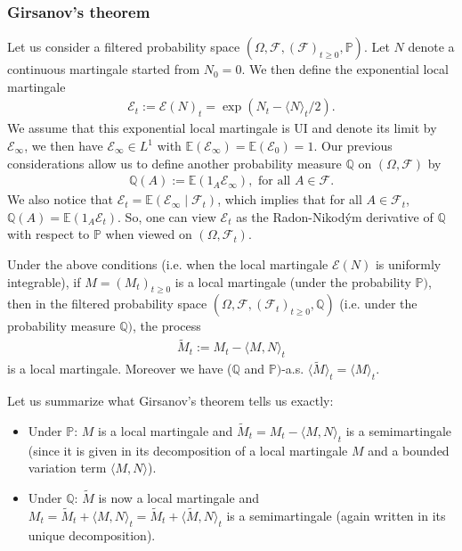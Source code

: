 \documentclass[../mainfile.tex]{subfiles}
\begin{document}
\subsubsection{Girsanov's theorem}
Let us consider a filtered probability space $( \Omega, \mathcal{F}, ( \mathcal{F})_{t \geq 0}, \mathbb{P})$. Let $N$ denote a continuous martingale started from $N_0=0$. We then define the exponential local martingale 
\begin{align*}
\mathcal{E}_t := \mathcal{E}(N)_t = \exp( N_t- \langle N \rangle_t/2 ).
\end{align*}
We assume that this exponential local martingale is UI and denote its limit by $\mathcal{E}_\infty$,  we then have  $\mathcal{E}_\infty \in L^1$ with $\mathbb{E}( \mathcal{E}_\infty)= \mathbb{E}( \mathcal{E}_0)=1$. Our previous considerations allow us to define another probability measure $\mathbb{Q}$ on $( \Omega, \mathcal{F})$ by 
\begin{align*}
\mathbb{Q}(A):= \mathbb{E}(1_A \mathcal{E}_\infty), \text{ for all } A \in \mathcal{F}.
\end{align*}
We also notice that $\mathcal{E}_t = \mathbb{E}( \mathcal{E}_\infty \mid \mathcal{F}_t)$, which implies that for all $A \in \mathcal{F}_t$, $\mathbb{Q}(A)= \mathbb{E}(1_A \mathcal{E}_t)$. So, one can view $\mathcal{E}_t$ as the Radon-Nikodým derivative of $\mathbb{Q}$ with respect to $\mathbb{P}$ when viewed on $(\Omega, \mathcal{F}_t)$. 
\begin{thm}[Girsanov] Under the above conditions (i.e. when the local martingale $\mathcal{E}(N)$ is uniformly integrable), if $M=(M_t)_{t \geq 0}$ is a local martingale (under the probability $\mathbb{P})$, then in the filtered probability space $(\Omega, \mathcal{F}, (\mathcal{F}_t)_{t \geq 0}, \mathbb{Q})$ (i.e. under the probability measure $\mathbb{Q})$, the process 
\begin{align*}
\tilde{M}_t:= M_t - \langle M, N \rangle_t
\end{align*}
is a local martingale. Moreover we have ($\mathbb{Q}$ and $\mathbb{P})$-a.s. $\langle \tilde{M}\rangle_t = \langle M \rangle_t$. 
\end{thm}
Let us summarize what Girsanov's theorem tells us exactly:
\begin{itemize}
\item Under $\mathbb{P}$: $M$ is a local martingale and $\tilde{M}_t= M_t- \langle M, N \rangle_t$ is a semimartingale (since it is given in its decomposition of a local martingale $M$ and a bounded variation term $\langle M, N\rangle$). 
\item Under $\mathbb{Q}$: $\tilde{M}$ is now a local martingale and $M_t= \tilde{M}_t + \langle M,N \rangle_t = \tilde{M}_t + \langle \tilde{M}, N \rangle_t$ is a semimartingale (again written in its unique decomposition). 
\end{itemize}
\end{document}
